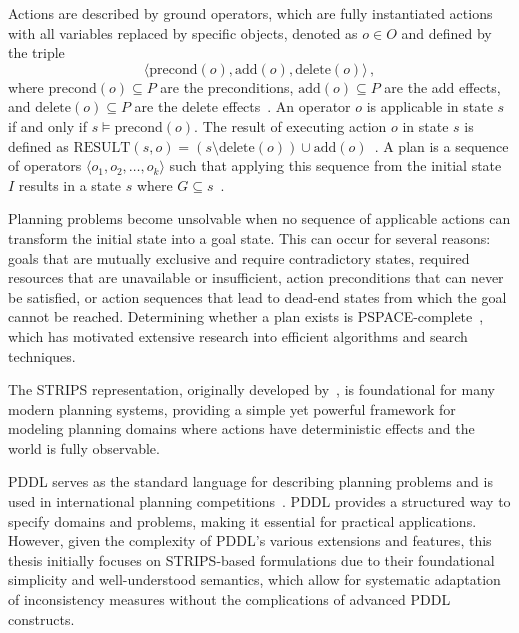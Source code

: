 \documentclass[proposal,english,palatino]{AIGpaper}
\begin{document}
Actions are described by ground operators, which are fully instantiated actions with all variables replaced by specific objects, denoted as $o \in O$ and defined by the triple
\begin{equation*}
  \langle \text{precond}(o), \text{add}(o), \text{delete}(o) \rangle\,,
\end{equation*}
where $\text{precond}(o) \subseteq P$ are the preconditions, $\text{add}(o) \subseteq P$ are the add effects, and $\text{delete}(o) \subseteq P$ are the delete effects~\cite{Bylander1994}. An operator $o$ is applicable in state $s$ if and only if $s \models \text{precond}(o)$. The result of executing action $o$ in state $s$ is defined as $\text{RESULT}(s,o) = (s \setminus \text{delete}(o)) \cup \text{add}(o)$~\cite{Russell2016}. A plan is a sequence of operators $\langle o_1, o_2, \ldots, o_k \rangle$ such that applying this sequence from the initial state $I$ results in a state $s$ where $G \subseteq s$~\cite{Bylander1994}.

Planning problems become unsolvable when no sequence of applicable actions can transform the initial state into a goal state. This can occur for several reasons: goals that are mutually exclusive and require contradictory states, required resources that are unavailable or insufficient, action preconditions that can never be satisfied, or action sequences that lead to dead-end states from which the goal cannot be reached. Determining whether a plan exists is PSPACE-complete~\cite{Bylander1994}, which has motivated extensive research into efficient algorithms and search techniques.

The \ac{STRIPS} representation, originally developed by~\cite{Fikes1971}, is foundational for many modern planning systems, providing a simple yet powerful framework for modeling planning domains where actions have deterministic effects and the world is fully observable.

\ac{PDDL} serves as the standard language for describing planning problems and is used in international planning competitions~\cite{Ghallab1998}. \ac{PDDL} provides a structured way to specify domains and problems, making it essential for practical applications. However, given the complexity of \ac{PDDL}'s various extensions and features, this thesis initially focuses on \ac{STRIPS}-based formulations due to their foundational simplicity and well-understood semantics, which allow for systematic adaptation of inconsistency measures without the complications of advanced \ac{PDDL} constructs.
\end{document}
